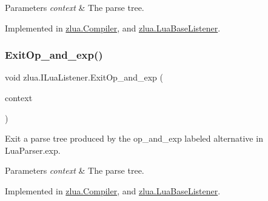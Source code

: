\begin{DoxyParams}{Parameters}
{\em context} & The parse tree.\\
\hline
\end{DoxyParams}


Implemented in \mbox{\hyperlink{classzlua_1_1_compiler_affc819ef0753a9871122ffe4144bffe2}{zlua.\+Compiler}}, and \mbox{\hyperlink{classzlua_1_1_lua_base_listener_a01605f22d70f39a286e5c768e347e788}{zlua.\+Lua\+Base\+Listener}}.

\mbox{\label{interfacezlua_1_1_i_lua_listener_a87ea223ce3d022a98247e31bcdd4490d}} 
\subsubsection{\texorpdfstring{Exit\+Op\+\_\+and\+\_\+exp()}{ExitOp\_and\_exp()}}
{\footnotesize\ttfamily void zlua.\+I\+Lua\+Listener.\+Exit\+Op\+\_\+and\+\_\+exp (\begin{DoxyParamCaption}\item[{\mbox{[}\+Not\+Null\mbox{]} \mbox{\hyperlink{classzlua_1_1_lua_parser_1_1_op__and__exp_context}{Lua\+Parser.\+Op\+\_\+and\+\_\+exp\+Context}}}]{context }\end{DoxyParamCaption})}



Exit a parse tree produced by the {\ttfamily op\+\_\+and\+\_\+exp} labeled alternative in Lua\+Parser.\+exp. 


\begin{DoxyParams}{Parameters}
{\em context} & The parse tree.\\
\hline
\end{DoxyParams}


Implemented in \mbox{\hyperlink{classzlua_1_1_compiler_a51cc2b5c59894178b1afdeb578997e83}{zlua.\+Compiler}}, and \mbox{\hyperlink{classzlua_1_1_lua_base_listener_aceb367c135e67ca2d8c8372e57a4a2cb}{zlua.\+Lua\+Base\+Listener}}.

\mbox{\label{interfacezlua_1_1_i_lua_listener_a9ad347c8ee340aeff0c0f8bb311cae0a}} 
